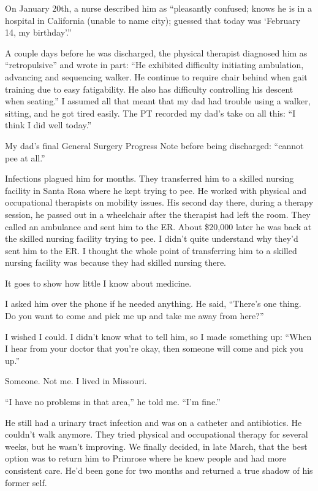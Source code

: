 \documentclass[12pt]{book}
\begin{document}
On January 20th, a nurse described him as ``pleasantly confused; knows he is in a hospital in California (unable to name city); guessed that today was `February 14, my birthday'.''

A couple days before he was discharged, the physical therapist diagnosed him as ``retropulsive'' and wrote in part: ``He exhibited difficulty initiating ambulation, advancing and sequencing walker. He continue to require chair behind when gait training due to easy fatigability. He also has difficulty controlling his descent when seating.'' I assumed all that meant that my dad had trouble using a walker, sitting, and he got tired easily. The PT recorded my dad's take on all this: ``I think I did well today.''

My dad's final General Surgery Progress Note before being discharged: ``cannot pee at all.''

Infections plagued him for months. They transferred him to a skilled nursing facility in Santa Rosa where he kept trying to pee. He worked with physical and occupational therapists on mobility issues. His second day there, during a therapy session, he passed out in a wheelchair after the therapist had left the room. They called an ambulance and sent him to the ER. About \$20,000 later he was back at the skilled nursing facility trying to pee. I didn't quite understand why they'd sent him to the ER. I thought the whole point of transferring him to a skilled nursing facility was because they had skilled nursing there.

It goes to show how little I know about medicine.

I asked him over the phone if he needed anything. He said, ``There's one thing. Do you want to come and pick me up and take me away from here?''

I wished I could. I didn't know what to tell him, so I made something up: ``When I hear from your doctor that you're okay, then someone will come and pick you up.''

Someone. Not me. I lived in Missouri.

``I have no problems in that area,'' he told me. ``I'm fine.''

He still had a urinary tract infection and was on a catheter and antibiotics. He couldn't walk anymore. They tried physical and occupational therapy for several weeks, but he wasn't improving. We finally decided, in late March, that the best option was to return him to Primrose where he knew people and had more consistent care. He'd been gone for two months and returned a true shadow of his former self.
\end{document}
